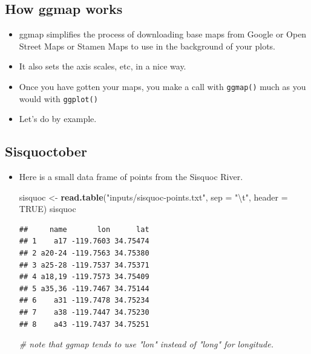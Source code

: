 \documentclass[]{book}
\newenvironment{Shaded}{\begin{snugshade}}{\end{snugshade}}
\newcommand{\KeywordTok}[1]{\textcolor[rgb]{0.13,0.29,0.53}{\textbf{{#1}}}}
\newcommand{\DataTypeTok}[1]{\textcolor[rgb]{0.13,0.29,0.53}{{#1}}}
\newcommand{\CharTok}[1]{\textcolor[rgb]{0.31,0.60,0.02}{{#1}}}
\newcommand{\StringTok}[1]{\textcolor[rgb]{0.31,0.60,0.02}{{#1}}}
\newcommand{\CommentTok}[1]{\textcolor[rgb]{0.56,0.35,0.01}{\textit{{#1}}}}
\newcommand{\OtherTok}[1]{\textcolor[rgb]{0.56,0.35,0.01}{{#1}}}
\newcommand{\NormalTok}[1]{{#1}}
\providecommand{\tightlist}{%
  \setlength{\itemsep}{0pt}\setlength{\parskip}{0pt}}
\theoremstyle{definition}
\theoremstyle{definition}
\theoremstyle{remark}
\begin{document}
\subsection{How ggmap works}\label{how-ggmap-works}

\begin{itemize}
\tightlist
\item
  ggmap simplifies the process of downloading base maps from Google or
  Open Street Maps or Stamen Maps to use in the background of your
  plots.
\item
  It also sets the axis scales, etc, in a nice way.\\
\item
  Once you have gotten your maps, you make a call with \texttt{ggmap()}
  much as you would with \texttt{ggplot()}
\item
  Let's do by example.
\end{itemize}

\subsection{Sisquoctober}\label{sisquoctober}

\begin{itemize}
\item
  Here is a small data frame of points from the Sisquoc River.

\begin{Shaded}
\begin{Highlighting}[]
\NormalTok{sisquoc <-}\StringTok{ }\KeywordTok{read.table}\NormalTok{(}\StringTok{"inputs/sisquoc-points.txt"}\NormalTok{, }\DataTypeTok{sep =} \StringTok{"}\CharTok{\textbackslash{}t}\StringTok{"}\NormalTok{, }\DataTypeTok{header =} \OtherTok{TRUE}\NormalTok{)}
\NormalTok{sisquoc}
\end{Highlighting}
\end{Shaded}

\begin{verbatim}
##     name       lon      lat
## 1    a17 -119.7603 34.75474
## 2 a20-24 -119.7563 34.75380
## 3 a25-28 -119.7537 34.75371
## 4 a18,19 -119.7573 34.75409
## 5 a35,36 -119.7467 34.75144
## 6    a31 -119.7478 34.75234
## 7    a38 -119.7447 34.75230
## 8    a43 -119.7437 34.75251
\end{verbatim}

\begin{Shaded}
\begin{Highlighting}[]
\CommentTok{# note that ggmap tends to use "lon" instead of "long" for longitude.}
\end{Highlighting}
\end{Shaded}
\end{itemize}
\end{document}
